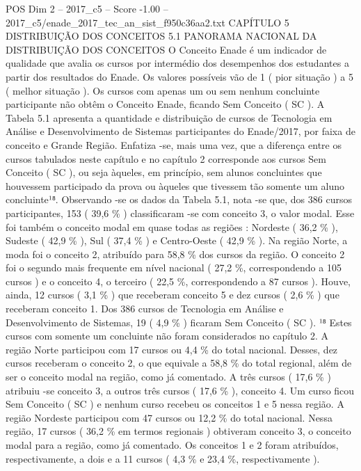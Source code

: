 \begin{textsample}{POS Dim 2 – 2017\_c5 – Score -1.00 – 2017\_c5/enade\_2017\_tec\_an\_sist\_f950c36aa2.txt}  \label{ex:f2_pos_388}
CAPÍTULO 5 DISTRIBUIÇÃO DOS CONCEITOS 5.1 PANORAMA NACIONAL DA DISTRIBUIÇÃO DOS CONCEITOS O Conceito Enade é um indicador de qualidade que avalia os cursos por intermédio dos desempenhos dos estudantes a partir dos resultados do Enade.
Os valores possíveis vão de 1 ( pior situação ) a 5 ( melhor situação ).
Os cursos com apenas um ou sem nenhum concluinte participante não obtêm o Conceito Enade, ficando Sem Conceito ( SC ).
A Tabela 5.1 apresenta a quantidade e distribuição de cursos de Tecnologia em Análise e Desenvolvimento de Sistemas participantes do Enade/2017, por faixa de conceito e Grande Região.
Enfatiza -se, mais uma vez, que a diferença entre os cursos tabulados neste capítulo e no capítulo 2 corresponde aos cursos Sem Conceito ( SC ), ou seja àqueles, em princípio, sem alunos concluintes que houvessem participado da prova ou àqueles que tivessem tão somente um aluno concluinte¹⁸.
Observando -se os dados da Tabela 5.1, nota -se que, dos 386 cursos participantes, 153 ( 39,6 \% ) classificaram -se com conceito 3, o valor modal.
Esse foi também o conceito modal em quase todas as regiões : Nordeste ( 36,2 \% ), Sudeste ( 42,9 \% ), Sul ( 37,4 \% ) e Centro-Oeste ( 42,9 \% ).
Na região Norte, a moda foi o conceito 2, atribuído para 58,8 \% dos cursos da região.
O conceito 2 foi o segundo mais frequente em nível nacional ( 27,2 \%, correspondendo a 105 cursos ) e o conceito 4, o terceiro ( 22,5 \%, correspondendo a 87 cursos ).
Houve, ainda, 12 cursos ( 3,1 \% ) que receberam conceito 5 e dez cursos ( 2,6 \% ) que receberam conceito 1.
Dos 386 cursos de Tecnologia em Análise e Desenvolvimento de Sistemas, 19 ( 4,9 \% ) ficaram Sem Conceito ( SC ). ¹⁸ Estes cursos com somente um concluinte não foram considerados no capítulo 2.
A região Norte participou com 17 cursos ou 4,4 \% do total nacional.
Desses, dez cursos receberam o conceito 2, o que equivale a 58,8 \% do total regional, além de ser o conceito modal na região, como já comentado.
A três cursos ( 17,6 \% ) atribuiu -se conceito 3, a outros três cursos ( 17,6 \% ), conceito 4.
Um curso ficou Sem Conceito ( SC ) e nenhum curso recebeu os conceitos 1 e 5 nessa região.
A região Nordeste participou com 47 cursos ou 12,2 \% do total nacional.
Nessa região, 17 cursos ( 36,2 \% em termos regionais ) obtiveram conceito 3, o conceito modal para a região, como já comentado.
Os conceitos 1 e 2 foram atribuídos, respectivamente, a dois e a 11 cursos ( 4,3 \% e 23,4 \%, respectivamente ).

\end{textsample}
